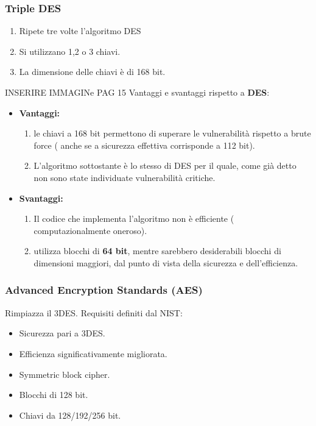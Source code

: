 \documentclass[12pt]{article}
\begin{document}
	\subsubsection{Triple DES}
		\begin{enumerate}
			\item Ripete tre volte l'algoritmo DES
			\item Si utilizzano 1,2 o 3 chiavi.
			\item La dimensione delle chiavi è di 168 bit.
		\end{enumerate}
		INSERIRE IMMAGINe PAG 15
		Vantaggi e svantaggi rispetto a \textbf{DES}:
		\begin{itemize}
			\item \textbf{Vantaggi:}
			\begin{enumerate}
				\item le chiavi a 168 bit permettono di superare le vulnerabilità rispetto a brute force ( anche se a sicurezza effettiva corrisponde a 112 bit).
				\item L'algoritmo sottostante è lo stesso di DES per il quale, come già detto non sono state individuate vulnerabilità critiche.
			\end{enumerate}
			\item \textbf{Svantaggi:} 
			\begin{enumerate}
				\item Il codice che implementa l'algoritmo non è efficiente ( computazionalmente oneroso).
				\item utilizza blocchi di \textbf{64 bit}, mentre sarebbero desiderabili blocchi di dimensioni maggiori, dal punto di vista della sicurezza e dell'efficienza.
			\end{enumerate}  
		\end{itemize}
	\subsubsection{Advanced Encryption Standards (AES)}
		Rimpiazza il 3DES. Requisiti definiti dal NIST:
		\begin{itemize}
			\item Sicurezza pari a 3DES.
			\item Efficienza significativamente migliorata.
			\item Symmetric block cipher.
			\item Blocchi di 128 bit.
			\item Chiavi da 128/192/256 bit.
		\end{itemize}
\end{document}
